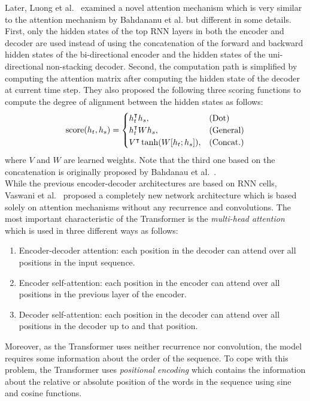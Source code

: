 \documentclass[10pt,twocolumn,letterpaper]{article}
\begin{document}
 Later, Luong et al.~\cite{LuongPM15} examined a novel attention mechanism which is very similar to the attention mechanism by Bahdananu et al. but different in some details. First, only the hidden states of the top RNN layers in both the encoder and decoder are used instead of using the concatenation of the forward and backward hidden states of the bi-directional encoder and the hidden states of the uni-directional non-stacking decoder. Second, the computation path is simplified by computing the attention matrix after computing the hidden state of the decoder at current time step. They also proposed the following three scoring functions to compute the degree of alignment between the hidden states as follows:
\[
{\rm score}(h_t, h_s) = 
\begin{cases}
h_t^\intercal h_s, & \textrm{(Dot)}\\
h_t^\intercal W h_s, & \textrm{(General)} \\ 
V^\intercal \tanh(W [h_t ;h_s]), & \textrm{(Concat.)}
\end{cases}
\]
where $V$ and $W$ are learned weights. Note that the third one based on the concatenation is originally proposed by Bahdanau et al.~\cite{BahdanauCB14}.
\\

 While the previous encoder-decoder architectures are based on RNN cells, Vaswani et al.~\cite{VaswaniSPUJGKP17} proposed 
a completely new network architecture which is based solely on attention mechanisms 
without any recurrence and convolutions. The most important characteristic of the Transformer is the {\em multi-head attention} which is used in three different ways as follows:
\begin{enumerate}
    \item Encoder-decoder attention: each position in the decoder can attend over all positions in the input sequence.
    \item Encoder self-attention: each position in the encoder can attend over all positions in the previous layer of the encoder.
    \item Decoder self-attention: each position in the decoder can attend over all positions in the decoder up to and that position.
\end{enumerate}

Moreover, as the Transformer uses neither recurrence nor convolution, the model requires some information about the order of the sequence. To cope with this problem, the Transformer uses {\em positional encoding} which contains the information about the relative or absolute position of the words in the sequence using sine and cosine functions.
\end{document}
